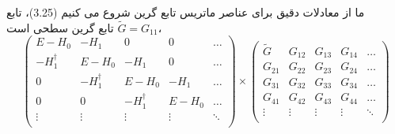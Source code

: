 ما از معادلات دقیق برای عناصر ماتریس تابع گرین شروع می کنیم (3.25)، تابع $\tilde{G}={{G}_{11}}$ تابع گرین سطحی است،
\begin{equation}
    \left( \begin{matrix}
           E-{{H}_{0}} & -{{H}_{1}} & 0 & 0 & \ldots   \\
           -H_{1}^{\dagger } & E-{{H}_{0}} & -{{H}_{1}} & 0 & \ldots   \\
           0 & -H_{1}^{\dagger } & E-{{H}_{0}} & -{{H}_{1}} & \ldots   \\
           0 & 0 & -H_{1}^{\dagger } & E-{{H}_{0}} & \ldots   \\
           \vdots  & \vdots  & \vdots  & \vdots  & \ddots   \\
        \end{matrix} \right)\times \left( \begin{matrix}
           {\tilde{G}} & {{G}_{12}} & {{G}_{13}} & {{G}_{14}} & \ldots   \\
           {{G}_{21}} & {{G}_{22}} & {{G}_{23}} & {{G}_{24}} & \ldots   \\
           {{G}_{31}} & {{G}_{32}} & {{G}_{33}} & {{G}_{34}} & \ldots   \\
           {{G}_{41}} & {{G}_{42}} & {{G}_{43}} & {{G}_{44}} & \ldots   \\
           \vdots  & \vdots  & \vdots  & \vdots  & \ddots   \\
        \end{matrix} \right)
\end{equation}

